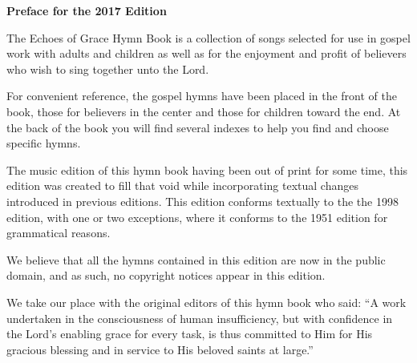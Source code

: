 \documentclass{book}
\begin{document}

\noindent\hfil{\textbf{Preface for the 2017 Edition}}\hfil

The {\textit{}Echoes of Grace Hymn Book} is a collection of songs selected for
use in gospel work with adults and children as well as for the enjoyment and
profit of believers who wish to sing together unto the Lord.

For convenient reference, the gospel hymns have been placed in the front of the
book, those for believers in the center and those for children toward the end.
At the back of the book you will find several indexes to help you find and
choose specific hymns.

The music edition of this hymn book having been out of print for some time,
this edition was created to fill that void while incorporating textual changes
introduced in previous editions. This edition conforms textually to the the
1998 edition, with one or two exceptions, where it conforms to the 1951 edition
for grammatical reasons.

We believe that all the hymns contained in this edition are now in the public
domain, and as such, no copyright notices appear in this edition.

We take our place with the original editors of this hymn book who said: ``A
work undertaken in the consciousness of human insufficiency, but with
confidence in the Lord's enabling grace for every task, is thus committed to
Him for His gracious blessing and in service to His beloved saints at large.''
\end{document}

